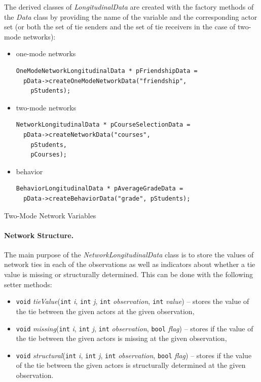 \documentclass[12pt]{article}
\makeatletter
\renewcommand{\=}{\,=\,}
\newcommand{\+}{\,+\,}
\newcommand{\nnm}[1]{\textsf{\small\textit{#1}}}
\renewcommand{\subsubsection}{\@startsection{subsubsection}{3}
                {0pt}{0.7\baselineskip}{0.3\baselineskip}
                {\sffamily} }
\makeatother
\begin{document}
The derived classes of \nnm{LongitudinalData} are created with the factory
methods of the \nnm{Data} class by providing the name of the variable and
the corresponding actor set (or both the set of tie senders and the set of
tie receivers in the case of two-mode networks):
\begin{itemize}
\item one-mode networks
\begin{verbatim}
OneModeNetworkLongitudinalData * pFriendshipData =
  pData->createOneModeNetworkData("friendship",
    pStudents);
\end{verbatim}
\item two-mode networks
\begin{verbatim}
NetworkLongitudinalData * pCourseSelectionData =
  pData->createNetworkData("courses",
    pStudents,
    pCourses);
\end{verbatim}
\item behavior
\begin{verbatim}
BehaviorLongitudinalData * pAverageGradeData =
  pData->createBehaviorData("grade", pStudents);
\end{verbatim}
\end{itemize}

\subsubsection{Two-Mode Network Variables}

\paragraph{Network Structure.}

The main purpose of the \nnm{NetworkLongitudinalData} class is to store the
values of network ties in each of the observations as well as indicators about
whether a tie value is missing or structurally determined. This can be done with
the following setter methods:
\begin{itemize}
\item \verb|void| \nnm{tieValue}(\verb|int| \nnm{i}, \verb|int| \nnm{j},
\verb|int| \nnm{observation}, \verb|int| \nnm{value}) -- stores the value of
the tie between the given actors at the given observation,
\item \verb|void| \nnm{missing}(\verb|int| \nnm{i}, \verb|int| \nnm{j},
\verb|int| \nnm{observation}, \verb|bool| \nnm{flag}) -- stores if the value of
the tie between the given actors is missing at the given observation,
\item \verb|void| \nnm{structural}(\verb|int| \nnm{i}, \verb|int| \nnm{j},
\verb|int| \nnm{observation}, \verb|bool| \nnm{flag}) -- stores if the value of
the tie between the given actors is structurally determined at the given
observation.
\end{itemize}
\end{document}
